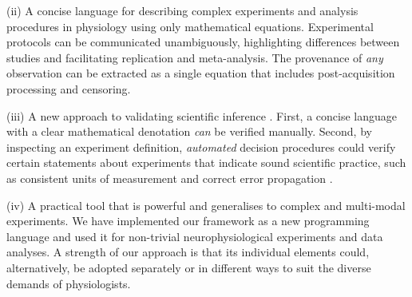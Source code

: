 (ii) A concise language for describing complex experiments and
analysis procedures in physiology using only mathematical
equations. Experimental protocols can be communicated unambiguously,
highlighting differences between studies and facilitating replication
and meta-analysis. The provenance
\citep{Pool2002,MacKenzie-Graham2008, VanHorn2009} of \emph{any}
observation can be extracted as a single equation that includes
post-acquisition processing and censoring.

(iii) A new approach to validating scientific inference
\citep{Editors2003, Editors2010}. First, a concise language with a
clear mathematical denotation \emph{can} be verified manually. Second, by
inspecting an experiment definition, \emph{automated} decision procedures
could verify certain statements about experiments that indicate sound
scientific practice, such as consistent units of measurement
\citep{Kennedy1997} and correct error propagation \citep{Taylor1997}.

(iv) A practical tool that is powerful and generalises to complex and
multi-modal experiments. We have implemented our framework as a new
programming language and used it for non-trivial neurophysiological
experiments and data analyses. A strength of our approach is that its
individual elements could, alternatively, be adopted separately or in
different ways to suit the diverse demands of physiologists.
